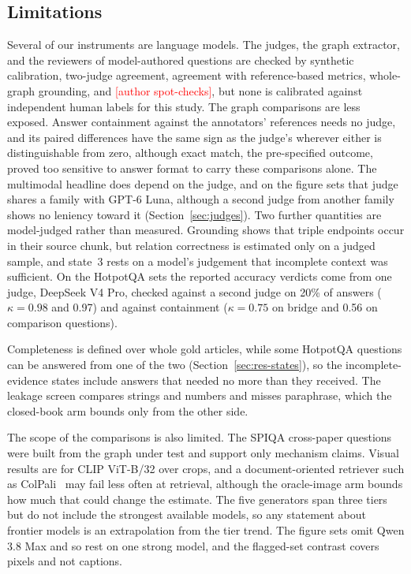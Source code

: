 \documentclass[preprint,12pt]{elsarticle}
\newcommand{\tbd}[1]{\textcolor{red}{[#1]}}
\begin{document}
\subsection{Limitations}
\label{sec:limitations}

Several of our instruments are language models. The judges, the graph
extractor, and the reviewers of model-authored questions are checked by
synthetic calibration, two-judge agreement, agreement with reference-based
metrics, whole-graph grounding, and \tbd{author spot-checks}, but none is
calibrated against independent human labels for this study. The graph
comparisons are less exposed. Answer containment against the annotators'
references needs no judge, and its paired differences have the same sign as
the judge's wherever either is distinguishable from zero, although exact match,
the pre-specified outcome, proved too sensitive to answer format to carry these
comparisons alone. The multimodal headline does depend on the judge,
and on the figure sets that judge shares a family with GPT-6 Luna, although a
second judge from another family shows no leniency toward it
(Section~\ref{sec:judges}). Two further quantities are model-judged rather than
measured. Grounding shows that triple endpoints occur in their source chunk,
but relation correctness is estimated only on a judged sample, and state~3
rests on a model's judgement that incomplete context was sufficient. On the
HotpotQA sets the reported accuracy verdicts come from one judge, DeepSeek V4 Pro,
checked against a second judge on 20\% of answers ($\kappa=0.98$ and 0.97) and
against containment ($\kappa=0.75$ on bridge and 0.56 on comparison questions).

Completeness is defined over whole gold articles, while some HotpotQA
questions can be answered from one of the two (Section~\ref{sec:res-states}),
so the incomplete-evidence states include answers that needed no more than
they received. The leakage screen compares strings and numbers and misses
paraphrase, which the closed-book arm bounds only from the other side.

The scope of the comparisons is also limited. The SPIQA cross-paper questions
were built from the graph under test and support only mechanism claims. Visual
results are for CLIP ViT-B/32 over crops, and a document-oriented retriever
such as ColPali~\cite{faysse2024colpali} may fail less often at retrieval,
although the oracle-image arm bounds how much that could change the estimate.
The five generators span three tiers but do not include the strongest
available models, so any statement about frontier models is an extrapolation
from the tier trend. The figure sets omit Qwen 3.8 Max and so rest on one strong
model, and the flagged-set contrast covers pixels and not captions.
\end{document}
